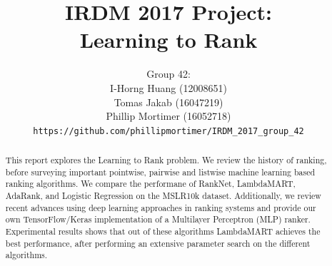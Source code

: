 \documentclass[english]{article}
\theoremstyle{definition}
\begin{document}
\title{IRDM 2017 Project:\\Learning to Rank
}
\author{Group 42:\\
I-Horng Huang (12008651) \\
Tomas Jakab (16047219)\\
Phillip Mortimer (16052718)\\
\texttt{https://github.com/phillipmortimer/IRDM\_2017\_group\_42}}
\maketitle


\begin{abstract}
This report explores the Learning to Rank problem. We review the history of ranking, before surveying important pointwise, pairwise and listwise machine learning based ranking algorithms.  We compare the performane of RankNet, LambdaMART, AdaRank, and Logistic Regression on the MSLR10k dataset.  Additionally, we review recent advances using deep learning approaches in ranking systems and provide our own TensorFlow/Keras implementation of a Multilayer Perceptron (MLP) ranker.  Experimental results shows that out of these algorithms LambdaMART achieves the best performance, after performing an extensive parameter search on the different algorithms.
\end{abstract}
\end{document}
